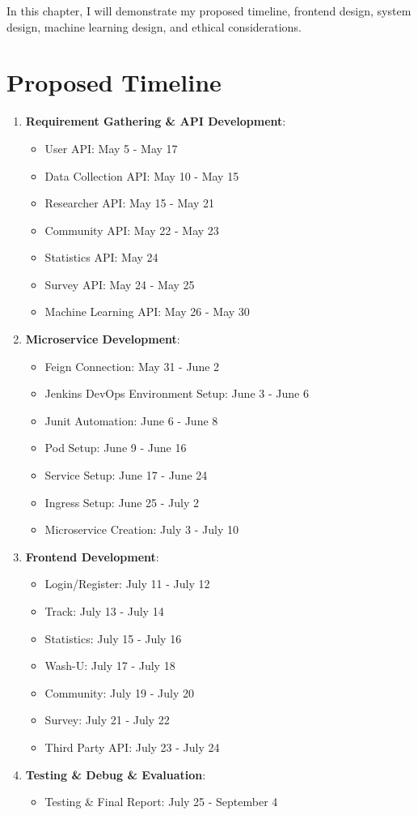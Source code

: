 \documentclass[12pt,two side]{report}
\begin{document}
In this chapter, I will demonstrate my proposed timeline, frontend design, system design, machine learning design, and ethical considerations. 

\section{Proposed Timeline}
\begin{enumerate}
    \item \textbf{Requirement Gathering \& API Development}:
    \begin{itemize}
        \item User API: May 5 - May 17
        \item Data Collection API: May 10 - May 15
        \item Researcher API: May 15 - May 21
        \item Community API: May 22 - May 23
        \item Statistics API: May 24
        \item Survey API: May 24 - May 25
        \item Machine Learning API: May 26 - May 30
    \end{itemize}
    
    \item \textbf{Microservice Development}:
    \begin{itemize}
        \item Feign Connection: May 31 - June 2
        \item Jenkins DevOps Environment Setup: June 3 - June 6
        \item Junit Automation: June 6 - June 8
        \item Pod Setup: June 9 - June 16
        \item Service Setup: June 17 - June 24
        \item Ingress Setup: June 25 - July 2
        \item Microservice Creation: July 3 - July 10
    \end{itemize}
    
    \item \textbf{Frontend Development}:
    \begin{itemize}
        \item Login/Register: July 11 - July 12
        \item Track: July 13 - July 14
        \item Statistics: July 15 - July 16
        \item Wash-U: July 17 - July 18
        \item Community: July 19 - July 20
        \item Survey: July 21 - July 22
        \item Third Party API: July 23 - July 24
    \end{itemize}
    
    \item \textbf{Testing \& Debug \& Evaluation}:
    \begin{itemize}
        \item Testing \& Final Report: July 25 - September 4
    \end{itemize}
\end{enumerate}
\end{document}
